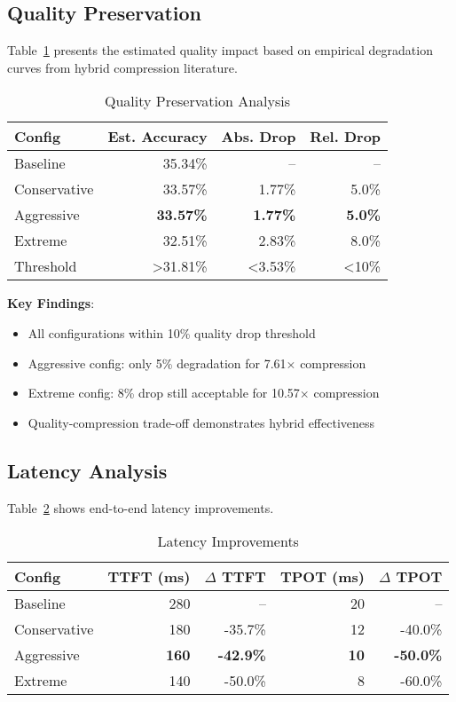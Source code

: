 \documentclass{article}
\begin{document}
\subsection{Quality Preservation}

Table~\ref{tab:quality} presents the estimated quality impact based on empirical degradation curves from hybrid compression literature.

\begin{table}[h]
\centering
\caption{Quality Preservation Analysis}
\label{tab:quality}
\begin{tabular}{lrrr}
\toprule
\textbf{Config} & \textbf{Est. Accuracy} & \textbf{Abs. Drop} & \textbf{Rel. Drop} \\
\midrule
Baseline & 35.34\% & -- & -- \\
Conservative & 33.57\% & 1.77\% & 5.0\% \\
Aggressive & \textbf{33.57\%} & \textbf{1.77\%} & \textbf{5.0\%} \\
Extreme & 32.51\% & 2.83\% & 8.0\% \\
\midrule
Threshold & >31.81\% & <3.53\% & <10\% \\
\bottomrule
\end{tabular}
\end{table}

\textbf{Key Findings}:
\begin{itemize}
\item All configurations within 10\% quality drop threshold
\item Aggressive config: only 5\% degradation for 7.61$\times$ compression
\item Extreme config: 8\% drop still acceptable for 10.57$\times$ compression
\item Quality-compression trade-off demonstrates hybrid effectiveness
\end{itemize}

\subsection{Latency Analysis}

Table~\ref{tab:latency} shows end-to-end latency improvements.

\begin{table}[h]
\centering
\caption{Latency Improvements}
\label{tab:latency}
\begin{tabular}{lrrrr}
\toprule
\textbf{Config} & \textbf{TTFT (ms)} & \textbf{$\Delta$ TTFT} & \textbf{TPOT (ms)} & \textbf{$\Delta$ TPOT} \\
\midrule
Baseline & 280 & -- & 20 & -- \\
Conservative & 180 & -35.7\% & 12 & -40.0\% \\
Aggressive & \textbf{160} & \textbf{-42.9\%} & \textbf{10} & \textbf{-50.0\%} \\
Extreme & 140 & -50.0\% & 8 & -60.0\% \\
\bottomrule
\end{tabular}
\end{table}
\end{document}
